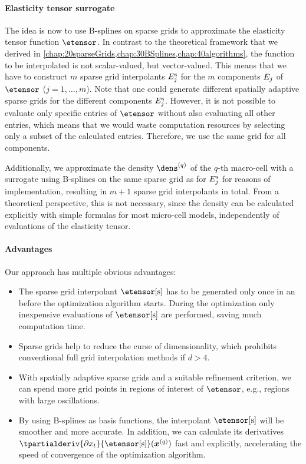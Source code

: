 \paragraph{Elasticity tensor surrogate}

The idea is now to use B-splines on sparse grids to approximate
the elasticity tensor function $\etensor$.
In contrast to the theoretical framework that we derived in
\cref{chap:20sparseGrids,chap:30BSplines,chap:40algorithms},
the function to be interpolated is not scalar-valued, but vector-valued.
This means that we have to construct $m$ sparse grid interpolants
$\etensorentry[\sparse]{j}$
for the $m$ components $\etensorentry{j}$ of $\etensor$ ($j = 1, \dotsc, m$).
Note that one could generate different spatially adaptive sparse grids for the
different components $\etensorentry[\sparse]{j}$.
However, it is not possible to evaluate only specific entries of $\etensor$
without also evaluating all other entries,
which means that we would waste computation resources by selecting only
a subset of the calculated entries.
Therefore, we use the same grid for all components.

Additionally, we approximate the density $\dens^{(q)}$
of the $q$-th macro-cell with a surrogate using
B-splines on the same sparse grid as for $\etensorentry[\sparse]{j}$
for reasons of implementation,
resulting in $m + 1$ sparse grid interpolants in total.
From a theoretical perspective, this is not necessary,
since the density can be calculated explicitly with simple formulas
for most micro-cell models, independently of evaluations of the
elasticity tensor.

\paragraph{Advantages}

Our approach has multiple obvious advantages:
\begin{itemize}
  \item
  The sparse grid interpolant $\etensor[\sparse]$ has to be generated only
  once in an  before the optimization algorithm starts.
  During the optimization 
  only inexpensive evaluations of $\etensor[\sparse]$ are performed,
  saving much computation time.
  
  \item
  Sparse grids help to reduce the curse of dimensionality, which prohibits
  conventional full grid interpolation methods if $d > 4$.
  
  \item
  With spatially adaptive sparse grids and a suitable refinement criterion,
  we can spend more grid points in regions of interest of $\etensor$,
  e.g., regions with large oscillations.
  
  \item
  By using B-splines as basis functions,
  the interpolant $\etensor[\sparse]$ will be smoother and more accurate.
  In addition, we can calculate its derivatives
  $\tpartialderiv{\partialdiff{} x_t}{\etensor[\sparse]}(\*x^{(q)})$
  fast and explicitly,
  accelerating the speed of convergence of the optimization algorithm.
\end{itemize}




